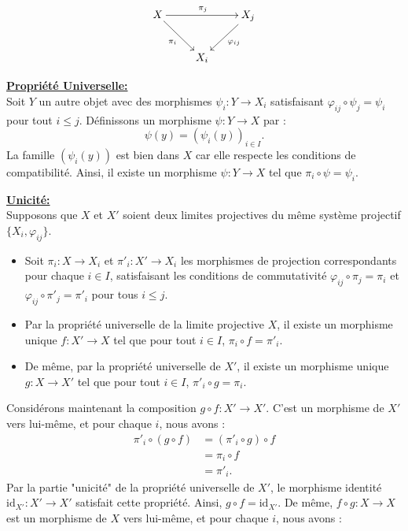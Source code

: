 \documentclass[a4paper, 14pt]{report}
\begin{document}
\begin{onehalfspace}
{			\[
			\xymatrix{
				X \ar[rr]^{\pi_{j}} \ar[dr]_{\pi_i} & & X_{j} \ar[dl]^{\varphi_{ij}} \\
				& X_{i} &
			}
			\]
			
			
			\textbf{\underline{Propriété Universelle:}}\\
			Soit \(Y\) un autre objet avec des morphismes \(\psi_i : Y \to X_i\) satisfaisant \(\varphi_{ij} \circ \psi_j = \psi_i\) pour tout \(i \leq j\). Définissons un morphisme \(\psi : Y \to X\) par :
			\[
			\psi(y) = (\psi_i(y))_{i \in I}.
			\]
			La famille \((\psi_i(y))\) est bien dans \(X\) car elle respecte les conditions de compatibilité. Ainsi, il existe un morphisme \(\psi : Y \to X\) tel que \(\pi_i \circ \psi = \psi_i\).
			
			\textbf{\underline{Unicité:}}\\
			Supposons que \(X\) et \(X'\) soient deux limites projectives du même système projectif \(\{X_i, \varphi_{ij}\}\).
			
			\begin{itemize}
				\item Soit \(\pi_i : X \to X_i\) et \(\pi'_i : X' \to X_i\) les morphismes de projection correspondants pour chaque \(i \in I\), satisfaisant les conditions de commutativité \(\varphi_{ij} \circ \pi_j = \pi_i\) et \(\varphi_{ij} \circ \pi'_j = \pi'_i\) pour tous \(i \leq j\).
				\item Par la propriété universelle de la limite projective \(X\), il existe un morphisme unique \(f : X' \to X\) tel que pour tout \(i \in I\), \(\pi_i \circ f = \pi'_i\).
				\item De même, par la propriété universelle de \(X'\), il existe un morphisme unique \(g : X \to X'\) tel que pour tout \(i \in I\), \(\pi'_i \circ g = \pi_i\).
			\end{itemize}
			
			Considérons maintenant la composition \(g \circ f : X' \to X'\). C'est un morphisme de \(X'\) vers lui-même, et pour chaque \(i\), nous avons :
			\[
			\begin{aligned}
				\pi'_i \circ (g \circ f) &= (\pi'_i \circ g) \circ f \\
				&= \pi_i \circ f \\
				&= \pi'_i.
			\end{aligned}
			\]
			Par la partie "unicité" de la propriété universelle de \(X'\), le morphisme identité \(\text{id}_{X'} : X' \to X'\) satisfait cette propriété. Ainsi, \(g \circ f = \text{id}_{X'}\).
			De même, \(f \circ g : X \to X\) est un morphisme de \(X\) vers lui-même, et pour chaque \(i\), nous avons :
			
}
\end{onehalfspace}
\end{document}

